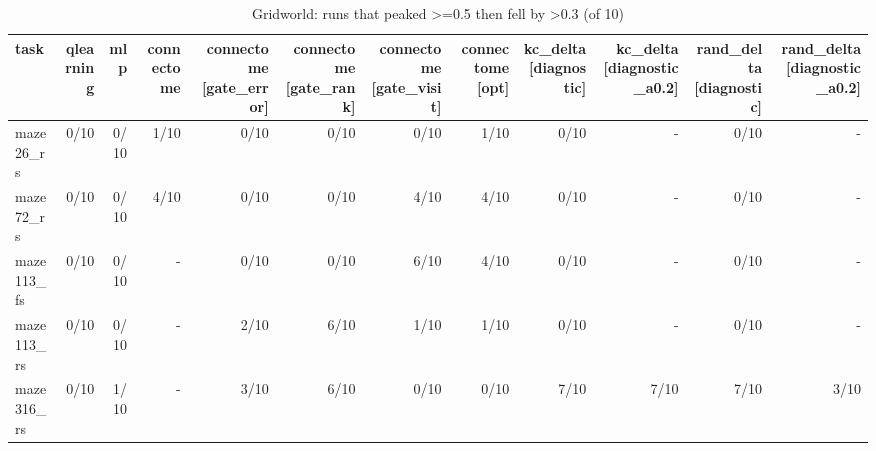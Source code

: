 \begin{table}[t]
\centering
\small
\begin{tabular}{lrrrrrrrrrrr}
\toprule
task & qlearning & mlp & connectome & connectome [gate\_error] & connectome [gate\_rank] & connectome [gate\_visit] & connectome [opt] & kc\_delta [diagnostic] & kc\_delta [diagnostic\_a0.2] & rand\_delta [diagnostic] & rand\_delta [diagnostic\_a0.2] \\
\midrule
maze26\_rs & 0/10 & 0/10 & 1/10 & 0/10 & 0/10 & 0/10 & 1/10 & 0/10 & - & 0/10 & - \\
maze72\_rs & 0/10 & 0/10 & 4/10 & 0/10 & 0/10 & 4/10 & 4/10 & 0/10 & - & 0/10 & - \\
maze113\_fs & 0/10 & 0/10 & - & 0/10 & 0/10 & 6/10 & 4/10 & 0/10 & - & 0/10 & - \\
maze113\_rs & 0/10 & 0/10 & - & 2/10 & 6/10 & 1/10 & 1/10 & 0/10 & - & 0/10 & - \\
maze316\_rs & 0/10 & 1/10 & - & 3/10 & 6/10 & 0/10 & 0/10 & 7/10 & 7/10 & 7/10 & 3/10 \\
\bottomrule
\end{tabular}
\caption{Gridworld: runs that peaked >=0.5 then fell by >0.3 (of 10)}
\label{tab:gridworld_collapse}
\end{table}